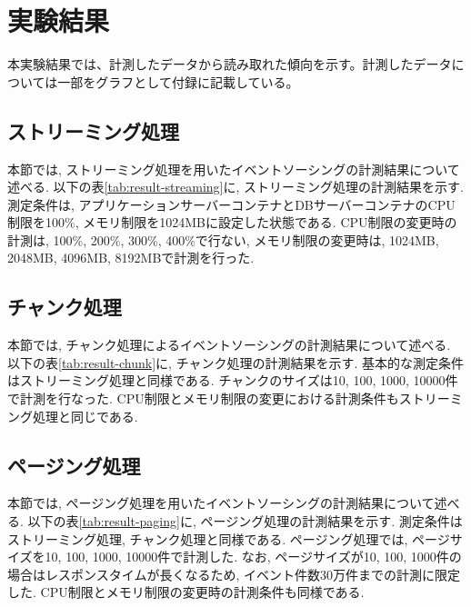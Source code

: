 \documentclass[../../main]{subfiles}
\begin{document}
    \section{実験結果}\label{sec:result}

    本実験結果では、計測したデータから読み取れた傾向を示す。計測したデータについては一部をグラフとして付録に記載している。

    \subsection{ストリーミング処理}\label{subsec:result-streaming}

    本節では, ストリーミング処理を用いたイベントソーシングの計測結果について述べる. 以下の表\ref{tab:result-streaming}に, ストリーミング処理の計測結果を示す. 測定条件は, アプリケーションサーバーコンテナとDBサーバーコンテナのCPU制限を100\%, メモリ制限を1024MBに設定した状態である. CPU制限の変更時の計測は, 100\%, 200\%, 300\%, 400\%で行ない, メモリ制限の変更時は, 1024MB, 2048MB, 4096MB, 8192MBで計測を行った.

    

    \subsection{チャンク処理}\label{subsec:result-chunk}

    本節では, チャンク処理によるイベントソーシングの計測結果について述べる. 以下の表\ref{tab:result-chunk}に, チャンク処理の計測結果を示す. 基本的な測定条件はストリーミング処理と同様である. チャンクのサイズは10, 100, 1000, 10000件で計測を行なった. CPU制限とメモリ制限の変更における計測条件もストリーミング処理と同じである.

    

    \subsection{ページング処理}\label{subsec:result-paging}

    本節では, ページング処理を用いたイベントソーシングの計測結果について述べる. 以下の表\ref{tab:result-paging}に, ページング処理の計測結果を示す. 測定条件はストリーミング処理, チャンク処理と同様である. ページング処理では, ページサイズを10, 100, 1000, 10000件で計測した. なお, ページサイズが10, 100, 1000件の場合はレスポンスタイムが長くなるため, イベント件数30万件までの計測に限定した. CPU制限とメモリ制限の変更時の計測条件も同様である.
\end{document}
